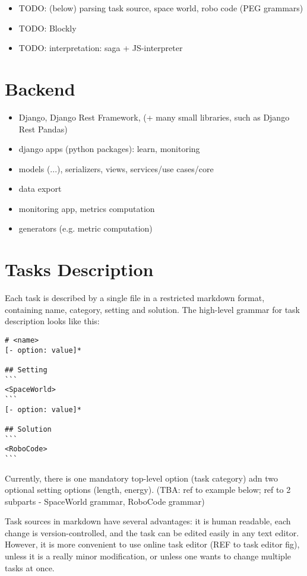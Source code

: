 \begin{itemize}
\item TODO: (below) parsing task source, space world, robo code (PEG grammars)
\item TODO: Blockly
\item TODO: interpretation: saga + JS-interpreter
\end{itemize}

\section{Backend}

\begin{itemize}
\item Django, Django Rest Framework, (+ many small libraries, such as Django Rest Pandas)
\item django apps (python packages): learn, monitoring
\item models (...), serializers, views, services/use cases/core
\item data export
\item monitoring app, metrics computation
\item generators (e.g. metric computation)
\end{itemize}


\section{Tasks Description}

Each task is described by a single file in a restricted markdown format,
containing name, category, setting and solution.
The high-level grammar for task description looks like this:

\begin{lstlisting}
# <name>
[- option: value]*

## Setting
```
<SpaceWorld>
```
[- option: value]*

## Solution
```
<RoboCode>
```
\end{lstlisting}

Currently, there is one mandatory top-level option (task category)
adn two optional setting options (length, energy).
(TBA: ref to example below; ref to 2 subparts - SpaceWorld grammar, RoboCode grammar)

Task sources in markdown have several advantages:
it is human readable,
each change is version-controlled,
and the task can be edited easily in any text editor.
However, it is more convenient to use online task editor (REF to task editor fig),
unless it is a really minor modification, or unless one wants to change multiple tasks at once.

